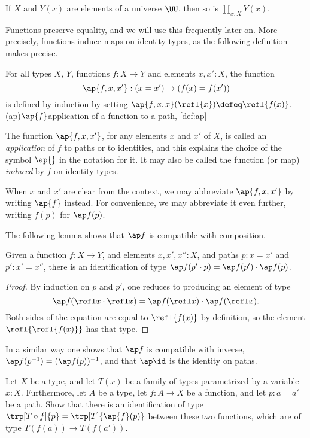 If $X$ and $Y(x)$ are elements of a universe $\UU$, then so is $\prod_{x:X} Y(x)$.

Functions preserve equality, and we will use this frequently later on.  More precisely, functions induce maps on identity types, as the
following definition makes precise.

\begin{definition}\label{def:ap}
For all types $X$, $Y$, functions $f:X\to Y$ and elements $x,x':X$, the function
$$\ap{f,x,x'} : (x = x') \to (f(x) = f(x'))$$ is defined by induction by setting
$\ap{f,x,x}(\refl{x})\defeq\refl{f(x)}$.%
\glossary(ap){$\protect\ap{f}$}{application of a function to a path, \cref{def:ap}}
\end{definition}

The function $\ap{f,x,x'}$, for any elements $x$ and $x'$ of $X$, is called an \emph{application} of $f$ to paths or to identities,
and this explains the choice of the symbol $\ap{}$ in the notation for it.
It may also be called the function (or map) \emph{induced} by $f$ on identity types.

When $x$ and $x'$ are clear from the context, we may abbreviate $\ap{f,x,x'}$ by writing $\ap{f}$ instead.
For convenience, we may abbreviate it even further, writing $f(p)$ for $\ap f (p)$.

The following lemma shows that $\ap f$ is compatible with composition.

\begin{lemma}\label{lem:apcomp}
  Given a function $f:X\to Y$, and elements $x,x',x'':X$, and paths $p : x = x'$ and $p' : x' = x''$,
  there is an identification of type $\ap f (p' \cdot p) =  \ap f (p') \cdot  \ap f (p)$.
\end{lemma}

\begin{proof}
  By induction on $p$ and $p'$, one reduces to producing an element of type
  \[
    \ap f (\refl x \cdot \refl x) =  \ap f ( \refl x ) \cdot  \ap f ( \refl x ).
  \]
  Both sides of the equation are equal to $\refl { f(x) }$ by definition, so the element $\refl {\refl { f(x) }}$
  has that type.
\end{proof}

In a similar way one shows that $\ap f$ is compatible with inverse,
$\ap f(p^{-1}) =  (\ap f (p))^{-1}$, and that $\ap \id$ is the identity on paths.


\begin{xca}\label{xca:trp-ap}
  Let $X$ be a type, and let $T(x)$ be a family of types parametrized by a variable $x:X$. Furthermore, let $A$ be a type, let $f:A\to X$ be a
  function, and let $p: a=a'$ be a path. Show that there is an identification of type $\trp[T \circ f]{p} = \trp[T]{\ap{f}(p)}$
  between these two functions, which are of type $T(f(a)) \to T(f(a'))$.
\end{xca}

